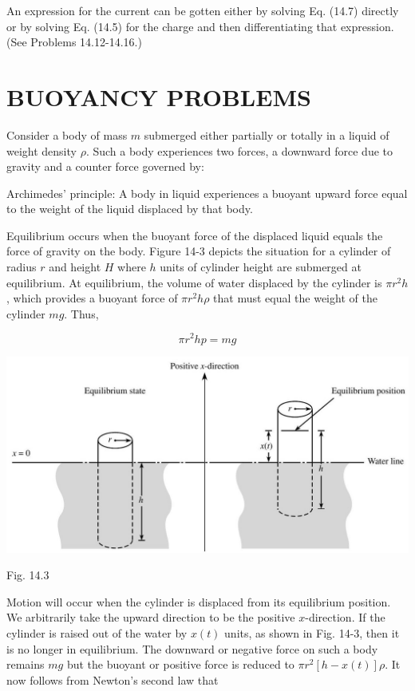 \documentclass[10pt]{article}
\begin{document}
An expression for the current can be gotten either by solving Eq. (14.7) directly or by solving Eq. (14.5) for the charge and then differentiating that expression. (See Problems 14.12-14.16.)

\section*{BUOYANCY PROBLEMS}
Consider a body of mass $m$ submerged either partially or totally in a liquid of weight density $\rho$. Such a body experiences two forces, a downward force due to gravity and a counter force governed by:

Archimedes' principle: A body in liquid experiences a buoyant upward force equal to the weight of the liquid displaced by that body.

Equilibrium occurs when the buoyant force of the displaced liquid equals the force of gravity on the body. Figure 14-3 depicts the situation for a cylinder of radius $r$ and height $H$ where $h$ units of cylinder height are submerged at equilibrium. At equilibrium, the volume of water displaced by the cylinder is $\pi r^{2} h$, which provides a buoyant force of $\pi r^{2} h \rho$ that must equal the weight of the cylinder $m g$. Thus,


\begin{equation*}
\pi r^{2} h p=m g \tag{14.9}
\end{equation*}


\begin{center}
\includegraphics[max width=\textwidth]{2024_04_03_5bb5b4275a64cb9887d1g-135}
\end{center}

Fig. 14.3

Motion will occur when the cylinder is displaced from its equilibrium position. We arbitrarily take the upward direction to be the positive $x$-direction. If the cylinder is raised out of the water by $x(t)$ units, as shown in Fig. 14-3, then it is no longer in equilibrium. The downward or negative force on such a body remains $m g$ but the buoyant or positive force is reduced to $\pi r^{2}[h-x(t)] \rho$. It now follows from Newton's second law that
\end{document}
